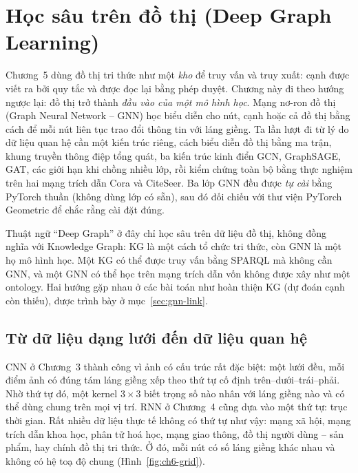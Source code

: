 \chapter{Học sâu trên đồ thị (Deep Graph Learning)}
\label{chap:gnn}

Chương~5 dùng đồ thị tri thức như một \emph{kho} để truy vấn và truy xuất: cạnh được viết ra bởi quy tắc và
được đọc lại bằng phép duyệt. Chương này đi theo hướng ngược lại: đồ thị trở thành \emph{đầu vào của một mô hình học}.
Mạng nơ-ron đồ thị (Graph Neural Network -- GNN) học biểu diễn cho nút, cạnh hoặc cả đồ thị bằng cách để mỗi nút
liên tục trao đổi thông tin với láng giềng. Ta lần lượt đi từ lý do dữ liệu quan hệ cần một kiến trúc riêng, cách biểu
diễn đồ thị bằng ma trận, khung truyền thông điệp tổng quát, ba kiến trúc kinh điển GCN, GraphSAGE, GAT, các giới hạn
khi chồng nhiều lớp, rồi kiểm chứng toàn bộ bằng thực nghiệm trên hai mạng trích dẫn Cora và CiteSeer. Ba lớp GNN đều
được \emph{tự cài} bằng PyTorch thuần (không dùng lớp có sẵn), sau đó đối chiếu với thư viện PyTorch Geometric
\cite{ch6:fey2019pyg} để chắc rằng cài đặt đúng.

Thuật ngữ ``Deep Graph'' ở đây chỉ học sâu trên dữ liệu đồ thị, không đồng nghĩa với Knowledge Graph: KG là một cách
tổ chức tri thức, còn GNN là một họ mô hình học. Một KG có thể được truy vấn bằng SPARQL mà không cần GNN, và một GNN
có thể học trên mạng trích dẫn vốn không được xây như một ontology. Hai hướng gặp nhau ở các bài toán như hoàn thiện
KG (dự đoán cạnh còn thiếu), được trình bày ở mục~\ref{sec:gnn-link}.

\section{Từ dữ liệu dạng lưới đến dữ liệu quan hệ}
\label{sec:gnn-grid}

CNN ở Chương~3 thành công vì ảnh có cấu trúc rất đặc biệt: một lưới đều, mỗi điểm ảnh có đúng tám láng
giềng xếp theo thứ tự cố định trên--dưới--trái--phải. Nhờ thứ tự đó, một kernel $3\times3$ biết trọng số nào nhân với
láng giềng nào và có thể dùng chung trên mọi vị trí. RNN ở Chương~4 cũng dựa vào một thứ tự: trục thời
gian. Rất nhiều dữ liệu thực tế không có thứ tự như vậy: mạng xã hội, mạng trích dẫn khoa học, phân tử hoá học, mạng
giao thông, đồ thị người dùng -- sản phẩm, hay chính đồ thị tri thức. Ở đó, mỗi nút có số láng giềng khác nhau và
không có hệ toạ độ chung (Hình~\ref{fig:ch6-grid}).

